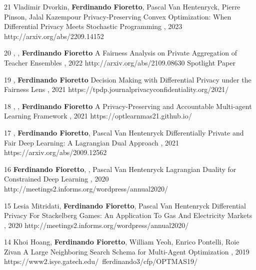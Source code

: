 \begin{pubs}
\wsentry 
	{21}%
	{Vladimir Dvorkin, {\bf Ferdinando Fioretto}, Pascal Van Hentenryck, Pierre Pinson, Jalal Kazempour}
	{Privacy-Preserving Convex Optimization: When Differential Privacy Meets Stochastic Programming}
	{, 2023}
	{http://arxiv.org/abs/2209.14152}


	\wsentryAwd
	{20} %
	{, , {\bf Ferdinando Fioretto}}
	{A Fairness Analysis on Private Aggregation of Teacher Ensembles}
	{, 2022}
	{http://arxiv.org/abs/2109.08630}
	{Spotlight Paper}
	
	\wsentry
	{19} %
	{, {\bf Ferdinando Fioretto}}
	{Decision Making with Differential Privacy under the Fairness Lens}
	{, 2021}
	{https://tpdp.journalprivacyconfidentiality.org/2021/}
 	
	\wsentry
	{18} %
	{, , {\bf Ferdinando Fioretto}}
	{A Privacy-Preserving and Accountable Multi-agent Learning Framework}
	{, 2021}
	{https://optlearnmas21.github.io/}

	\wsentry
	{17} %
	{, {\bf Ferdinando Fioretto}, Pascal Van 	Hentenryck}
	{Differentially Private and Fair Deep Learning: A Lagrangian Dual Approach}
	{, 2021}
	{https://arxiv.org/abs/2009.12562}

\wsentry 
	{16} %
	{{\bf Ferdinando Fioretto}, , Pascal Van Hentenryck}
	{Lagrangian Duality for Constrained Deep Learning}
	{, 2020}
	{http://meetings2.informs.org/wordpress/annual2020/}

\wsentry 
	{15} %
	{Lesia Mitridati, {\bf Ferdinando Fioretto}, Pascal Van Hentenryck}
	{Differential Privacy For Stackelberg Games: An Application To Gas And Electricity Markets}
	{, 2020}
	{http://meetings2.informs.org/wordpress/annual2020/}


\wsentry 
	{14} %
	{Khoi Hoang, {\bf Ferdinando Fioretto}, William Yeoh, Enrico Pontelli, Roie Zivan}
	{A Large Neighboring Search Schema for Multi-Agent Optimization} 
	{, 2019}
	{https://www2.isye.gatech.edu/~fferdinando3/cfp/OPTMAS19/}


\end{pubs}
